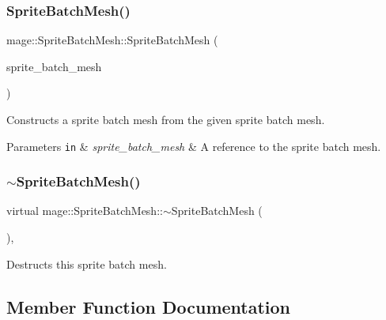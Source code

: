 \subsubsection{\texorpdfstring{Sprite\+Batch\+Mesh()}{SpriteBatchMesh()}\hspace{0.1cm}{\footnotesize\ttfamily [3/3]}}
{\footnotesize\ttfamily mage\+::\+Sprite\+Batch\+Mesh\+::\+Sprite\+Batch\+Mesh (\begin{DoxyParamCaption}\item[{\hyperlink{classmage_1_1_sprite_batch_mesh}{Sprite\+Batch\+Mesh} \&\&}]{sprite\+\_\+batch\+\_\+mesh }\end{DoxyParamCaption})\hspace{0.3cm}{\ttfamily [default]}}

Constructs a sprite batch mesh from the given sprite batch mesh.


\begin{DoxyParams}[1]{Parameters}
\mbox{\tt in}  & {\em sprite\+\_\+batch\+\_\+mesh} & A reference to the sprite batch mesh. \\
\hline
\end{DoxyParams}
\hypertarget{classmage_1_1_sprite_batch_mesh_aad8ae9446fd8f8159bb3531f31130032}{}\label{classmage_1_1_sprite_batch_mesh_aad8ae9446fd8f8159bb3531f31130032} 
\subsubsection{\texorpdfstring{$\sim$\+Sprite\+Batch\+Mesh()}{~SpriteBatchMesh()}}
{\footnotesize\ttfamily virtual mage\+::\+Sprite\+Batch\+Mesh\+::$\sim$\+Sprite\+Batch\+Mesh (\begin{DoxyParamCaption}{ }\end{DoxyParamCaption})\hspace{0.3cm}{\ttfamily [virtual]}, {\ttfamily [default]}}

Destructs this sprite batch mesh. 

\subsection{Member Function Documentation}
\hypertarget{classmage_1_1_sprite_batch_mesh_ab790dbbd3cb685c1f14d7ca1e9ed639b}{}\label{classmage_1_1_sprite_batch_mesh_ab790dbbd3cb685c1f14d7ca1e9ed639b} 
